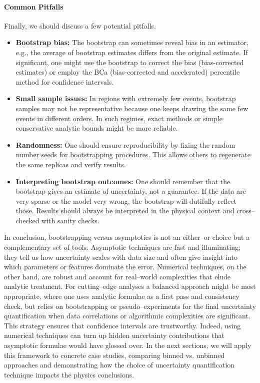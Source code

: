         \paragraph{Common Pitfalls}
            Finally, we should discuss a few potential pitfalls.
            \begin{itemize}
                \item \textbf{Bootstrap bias:}
                    The bootstrap can sometimes reveal bias in an estimator, e.g., the average of bootstrap estimates differs from the original estimate.
                    If significant, one might use the bootstrap to correct the bias (bias-corrected estimates) or employ the BCa (bias-corrected and accelerated) percentile method for confidence intervals.
                \item \textbf{Small sample issues:}
                    In regions with extremely few events, bootstrap samples may not be representative because one keeps drawing the same few events in different orders.
                    In such regimes, exact methods or simple conservative analytic bounds might be more reliable.
                \item \textbf{Randomness:}
                    One should ensure reproducibility by fixing the random number seeds for bootstrapping procedures.
                    This allows others to regenerate the same replicas and verify results.
                \item \textbf{Interpreting bootstrap outcomes:}
                    One should remember that the bootstrap gives an estimate of uncertainty, not a guarantee.
                    If the data are very sparse or the model very wrong, the bootstrap will dutifully reflect those.
                    Results should always be interpreted in the physical context and cross--checked with sanity checks.
            \end{itemize}
    In conclusion, bootstrapping versus asymptotics is not an either--or choice but a complementary set of tools.
    Asymptotic techniques are fast and illuminating;
    they tell us how uncertainty scales with data size and often give insight into which parameters or features dominate the error.
    Numerical techniques, on the other hand, are robust and account for real--world complexities that elude analytic treatment.
    For cutting--edge analyses a balanced approach might be most appropriate, where one uses analytic formulae as a first pass and consistency check, but relies on bootstrapping or pseudo--experiments for the final uncertainty quantification when data correlations or algorithmic complexities are significant.
    This strategy ensures that confidence intervals are trustworthy.
    Indeed, using numerical techniques can turn up hidden uncertainty contributions that asymptotic formulae would have glossed over.
    In the next sections, we will apply this framework to concrete case studies, comparing binned vs. unbinned approaches and demonstrating how the choice of uncertainty quantification technique impacts the physics conclusions.

